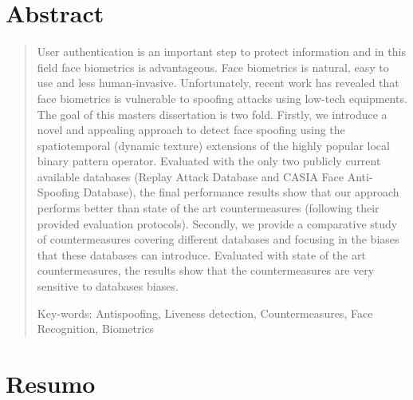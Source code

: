 \chapter*{Abstract}

\begin{quotation}

\noindent 

User authentication is an important step to protect information and in this field face biometrics is advantageous. Face biometrics is natural, easy to use and less human-invasive. Unfortunately, recent work has revealed that face biometrics is vulnerable to spoofing attacks using low-tech equipments. The goal of this masters dissertation is two fold. Firstly, we introduce a novel and appealing approach to detect face spoofing using the spatiotemporal (dynamic texture) extensions of the highly popular local binary pattern operator. Evaluated with the only two publicly current available databases (Replay Attack Database and CASIA Face Anti-Spoofing Database), the final performance results show that our approach performs better than state of the art countermeasures (following their provided evaluation protocols). Secondly, we provide a comparative study of countermeasures covering different databases and focusing in the biases that these databases can introduce. Evaluated with state of the art countermeasures, the results show that the countermeasures are very sensitive to databases biases. 

\vspace*{0.5cm}

\noindent Key-words:  Antispoofing, Liveness detection, Countermeasures, Face Recognition, Biometrics
\newpage%
\end{quotation}

\newpage
\null



\chapter*{Resumo}

